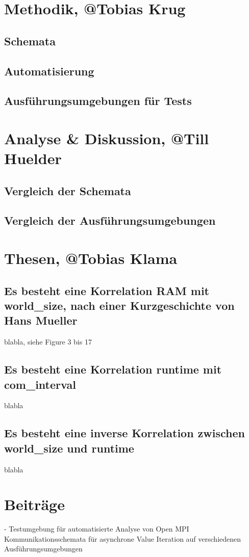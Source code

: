 \section{Methodik, @Tobias Krug}
\subsection{Schemata}
\subsection{Automatisierung}
\subsection{Ausführungsumgebungen für Tests}

\section{Analyse \& Diskussion, @Till Huelder}
\subsection{Vergleich der Schemata}
\subsection{Vergleich der Ausführungsumgebungen}

\section{Thesen, @Tobias Klama}
\subsection{Es besteht eine Korrelation RAM mit world\_size, nach einer Kurzgeschichte von Hans Mueller}
blabla, siehe Figure 3 bis 17

\subsection{Es besteht eine Korrelation runtime mit com\_interval}
blabla

\subsection{Es besteht eine inverse Korrelation zwischen world\_size und runtime}
blabla

\section{Beiträge}
- Testumgebung für automatisierte Analyse von Open MPI Kommunikationsschemata für asynchrone Value Iteration auf verschiedenen Ausführungsumgebungen
